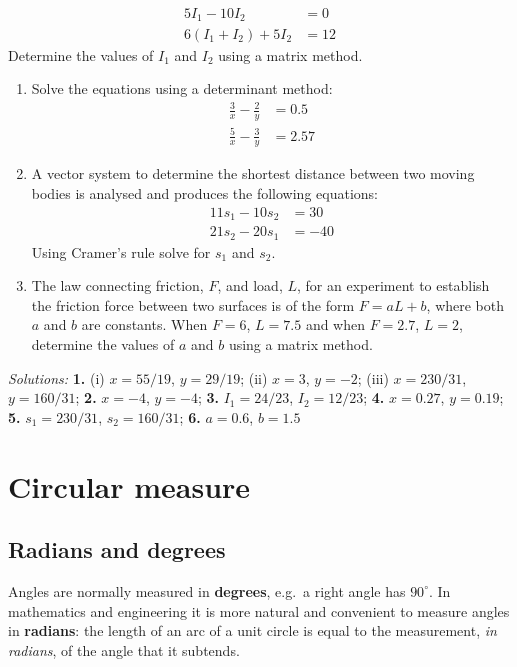 \documentclass[
  12pt,
  oneside]{book}
\theoremstyle{definition}
\theoremstyle{definition}
\theoremstyle{definition}
\theoremstyle{definition}
\theoremstyle{remark}
\begin{document}
\begin{align*}
5I_1 - 10I_2 &=0\\
6(I_1+I_2)+5I_2 &=12
\end{align*}
Determine the values of \(I_1\) and \(I_2\) using a matrix method.

\begin{enumerate}
\def\labelenumi{\arabic{enumi}.}
\setcounter{enumi}{3}
\item
  Solve the equations using a determinant method:
  \begin{align*}
  \frac{3}{x}-\frac{2}{y} &= 0.5\\
  \frac{5}{x}-\frac{3}{y} &= 2.57
  \end{align*}
\item
  A vector system to determine the shortest distance between two moving bodies is analysed and produces the following equations:
  \begin{align*}
  11s_1 - 10s_2 &= 30\\
  21s_2 - 20s_1 &= -40
  \end{align*}
  Using Cramer's rule solve for \(s_1\) and \(s_2\).
\item
  The law connecting friction, \(F\), and load, \(L\), for an experiment to establish the friction force between two surfaces is of the form \(F = aL + b\), where both \(a\) and \(b\) are constants.
  When \(F = 6\), \(L = 7.5\) and when \(F = 2.7\), \(L = 2\), determine the values of \(a\) and \(b\) using a matrix method.
\end{enumerate}

\emph{Solutions:}
\textbf{1.} (i) \(x=55/19\), \(y=29/19\);
(ii) \(x=3\), \(y=-2\);
(iii) \(x=230/31\), \(y=160/31\);
\textbf{2.} \(x=-4\), \(y=-4\);
\textbf{3.} \(I_1=24/23\), \(I_2=12/23\);
\textbf{4.} \(x=0.27\), \(y=0.19\);
\textbf{5.} \(s_1=230/31\), \(s_2=160/31\);
\textbf{6.} \(a=0.6\), \(b=1.5\)

\chapter{Circular measure}\label{circular-measure}

\section{Radians and degrees}\label{radians-and-degrees}

Angles are normally measured in \textbf{degrees}, e.g.~a right angle has \(90^\circ\). In mathematics and engineering it is more natural and convenient to measure angles in \textbf{radians}: the length of an arc of a unit circle is equal to the measurement, \emph{in radians}, of the angle that it subtends.
\end{document}
